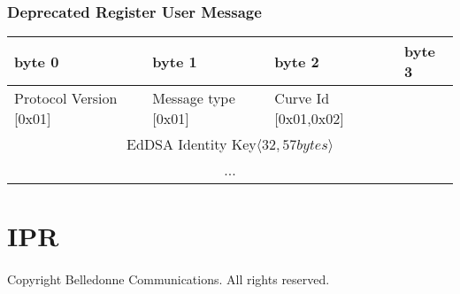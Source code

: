 \documentclass[a4paper,11pt]{article}
\begin{document}
    \subsubsection{Deprecated Register User Message}
      \begin{center}
      \begin{tabular}{ | p{1.4in} | p{1.4in} | p{1.4in} | p{1.4in} |}
        \hline
        \cellcolor[gray]{0.85} byte 0 & \cellcolor[gray]{0.85} byte 1 & \cellcolor[gray]{0.85} byte 2 & \cellcolor[gray]{0.85}byte 3\\
        \hline
        Protocol Version [0x01] & Message type [0x01] & Curve Id [0x01,0x02] &\\
        \cline{1-3}
        \multicolumn{4}{|c|}{EdDSA Identity Key$\langle 32,57bytes\rangle $}\\
        \multicolumn{4}{|c|}{...}\\
        \hline
      \end{tabular}
      \end{center}

\newpage
\section{IPR}
  \paragraph*{}Copyright Belledonne Communications.  All rights reserved.
\end{document}
